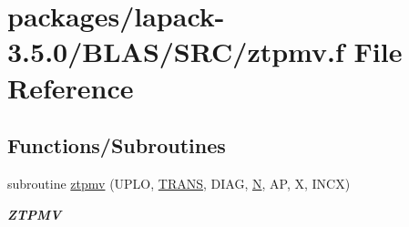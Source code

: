 \hypertarget{lapack-3_85_80_2BLAS_2SRC_2ztpmv_8f}{}\section{packages/lapack-\/3.5.0/\+B\+L\+A\+S/\+S\+R\+C/ztpmv.f File Reference}
\label{lapack-3_85_80_2BLAS_2SRC_2ztpmv_8f}
\subsection*{Functions/\+Subroutines}
\begin{DoxyCompactItemize}
\item 
subroutine \hyperlink{group__complex16__blas__level2_gaed33e3470ec372c730960b6038d1e037}{ztpmv} (U\+P\+L\+O, \hyperlink{superlu__enum__consts_8h_a0c4e17b2d5cea33f9991ccc6a6678d62a1f61e3015bfe0f0c2c3fda4c5a0cdf58}{T\+R\+A\+N\+S}, D\+I\+A\+G, \hyperlink{polmisc_8c_a0240ac851181b84ac374872dc5434ee4}{N}, A\+P, X, I\+N\+C\+X)
\begin{DoxyCompactList}\small\item\em {\bfseries Z\+T\+P\+M\+V} \end{DoxyCompactList}\end{DoxyCompactItemize}

